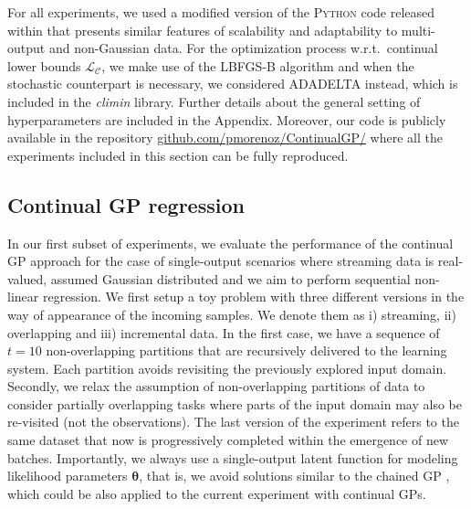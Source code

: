 \documentclass[]{article}
\newcommand{\Lcal}{\mathcal{L}}
\begin{document}
For all experiments, we used a modified version of the \textsc{Python} code released within \citet{morenomunoz2018} that presents similar features of scalability and adaptability to multi-output and non-Gaussian data. For the optimization process w.r.t.\ continual lower bounds $\Lcal_{\mathcal{C}}$, we make use of the LBFGS-B algorithm and when the stochastic counterpart is necessary, we considered ADADELTA instead, which is included in the \textit{climin} library. Further details about the general setting of hyperparameters are included in the Appendix. Moreover, our code is publicly available in the repository  \url{github.com/pmorenoz/ContinualGP/} where all the experiments included in this section can be fully reproduced.

\subsection{Continual GP regression} 

In our first subset of experiments, we evaluate the performance of the continual GP approach for the case of single-output scenarios where streaming data is real-valued, assumed Gaussian distributed and we aim to perform sequential non-linear regression. We first setup a toy problem with three different versions in the way of appearance of the incoming samples. We denote them as  i) streaming, ii) overlapping and iii) incremental data. In the first case, we have a sequence of $t=10$ non-overlapping partitions that are recursively delivered to the learning system. Each partition avoids revisiting the previously explored input domain. Secondly, we relax the assumption of non-overlapping partitions of data to consider partially overlapping tasks where parts of the input domain may also be re-visited (not the observations).  The last version of the experiment refers to the same dataset that now is progressively completed within the emergence of new batches. Importantly, we always use a single-output latent function for modeling likelihood parameters $\bm{\theta}$, that is, we avoid solutions similar to the chained GP \citep{saul2016chained}, which could be also applied to the current experiment with continual GPs.
\end{document}
